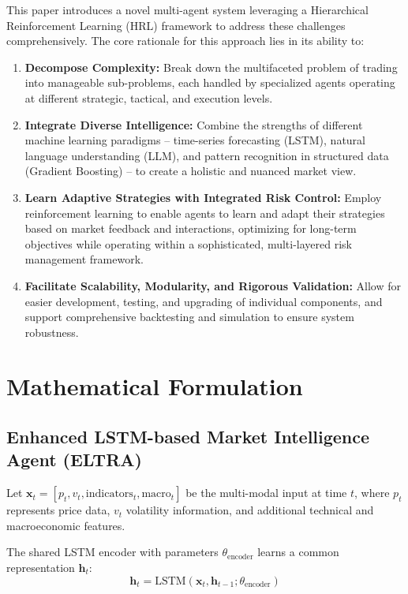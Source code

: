 \documentclass[11pt,a4paper]{article}
\begin{document}
This paper introduces a novel multi-agent system leveraging a Hierarchical Reinforcement Learning (HRL) framework to address these challenges comprehensively. The core rationale for this approach lies in its ability to:

\begin{enumerate}
\item \textbf{Decompose Complexity:} Break down the multifaceted problem of trading into manageable sub-problems, each handled by specialized agents operating at different strategic, tactical, and execution levels.
\item \textbf{Integrate Diverse Intelligence:} Combine the strengths of different machine learning paradigms -- time-series forecasting (LSTM), natural language understanding (LLM), and pattern recognition in structured data (Gradient Boosting) -- to create a holistic and nuanced market view.
\item \textbf{Learn Adaptive Strategies with Integrated Risk Control:} Employ reinforcement learning to enable agents to learn and adapt their strategies based on market feedback and interactions, optimizing for long-term objectives while operating within a sophisticated, multi-layered risk management framework.
\item \textbf{Facilitate Scalability, Modularity, and Rigorous Validation:} Allow for easier development, testing, and upgrading of individual components, and support comprehensive backtesting and simulation to ensure system robustness.
\end{enumerate}

\section{Mathematical Formulation}

\subsection{Enhanced LSTM-based Market Intelligence Agent (ELTRA)}

Let $\mathbf{x}_t = [p_t, v_t, \text{indicators}_t, \text{macro}_t]$ be the multi-modal input at time $t$, where $p_t$ represents price data, $v_t$ volatility information, and additional technical and macroeconomic features.

The shared LSTM encoder with parameters $\theta_{\text{encoder}}$ learns a common representation $\mathbf{h}_t$:
\begin{equation}
\mathbf{h}_t = \text{LSTM}(\mathbf{x}_t, \mathbf{h}_{t-1}; \theta_{\text{encoder}})
\end{equation}
\end{document}
